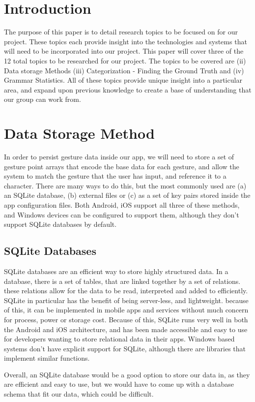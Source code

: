 \documentclass[onecolumn, draftclsnofoot,10pt, journal, letterpaper]{IEEEtran}
\begin{document}
\section{Introduction}
    The purpose of this paper is to detail research topics to be focused on for our project. These topics each provide insight into the technologies and systems that will need to be incorporated into our project. This paper will cover three of the 12 total topics to be researched for our project. The topics to be covered are (ii) Data storage Methods (iii) Categorization - Finding the Ground Truth and (iv) Grammar Statistics. All of these topics provide unique insight into a particular area, and expand upon previous knowledge to create a base of understanding that our group can work from.
        
\section{Data Storage Method}
    In order to persist gesture data inside our app, we will need to store a set of gesture point arrays that encode the base data for each gesture, and allow the system to match the gesture that the user has input, and reference it to a character. There are many ways to do this, but the most commonly used are (a) an SQLite database, (b) external files or (c) as a set of key pairs stored inside the app configuration files. Both Android, iOS support all three of these methods, and Windows devices can be configured to support them, although they don't support SQLite databases by default.
    
    \subsection{SQLite Databases}
    SQLite databases are an efficient way to store highly structured data. In a database, there is a set of tables, that are linked together by a set of relations. these relations allow for the data to be read, interpreted and added to efficiently. \cite{noauthor_what_2019} SQLite in particular has the benefit of being server-less, and lightweight. because of this, it can be implemented in mobile apps and services without much concern for process, power or storage cost. \cite{noauthor_what_2019} Because of this, SQLite runs very well in both the Android and iOS architecture, and has been made accessible and easy to use for developers wanting to store relational data in their apps. Windows based systems don't have explicit support for SQLite, although there are libraries that implement similar functions. \cite{noauthor_use_2018}\par
    Overall, an SQLite database would be a good option to store our data in, as they are efficient and easy to use, but we would have to come up with a database schema that fit our data, which could be difficult.
    
\end{document}
